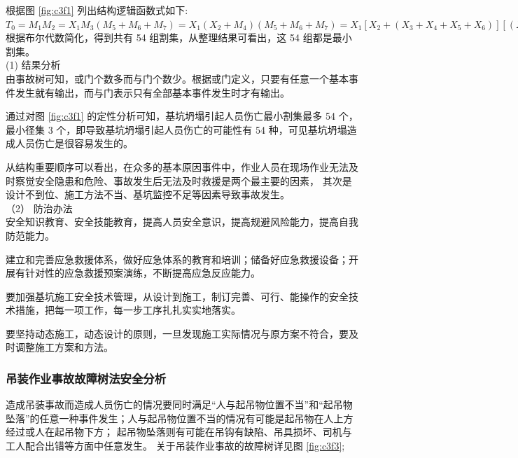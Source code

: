 根据图 \ref{fig:c3f1} 列出结构逻辑函数式如下:\\

$T_0=M_1M_2=X_1M_3(M_5+M_6+M_7)=X_1(X_2+M_4)(M_5+M_6+M_7)=X_1[X_2+(X_3+X_4+X_5+X_6)][(X_7+X_8+X_9)+(X_{10}+X_{11}+X_{12}+X_{13}+X_{14})+(X_{15}+X_{16}+X_{17})+X_{18}]$\\

根据布尔代数简化，得到共有 54 组割集，从整理结果可看出，这 54 组都是最小割集。\\

(1) 结果分析\\

 由事故树可知，或门个数多而与门个数少。根据或门定义，只要有任意一个基本事件发生就有输出，而与门表示只有全部基本事件发生时才有输出。

 通过对图 \ref{fig:c3f1} 的定性分析可知，基坑坍塌引起人员伤亡最小割集最多 54 个，最小径集 3 个，即导致基坑坍塌引起人员伤亡的可能性有 54 种，可见基坑坍塌造成人员伤亡是很容易发生的。

 从结构重要顺序可以看出，在众多的基本原因事件中，作业人员在现场作业无法及时察觉安全隐患和危险、事故发生后无法及时救援是两个最主要的因素，
其次是设计不到位、施工方法不当、基坑监控不足等因素导致事故发生。\\

（2） 防治办法\\

 安全知识教育、安全技能教育，提高人员安全意识，提高规避风险能力，提高自我防范能力。

 建立和完善应急救援体系，做好应急体系的教育和培训；储备好应急救援设备；开展有针对性的应急救援预案演练，不断提高应急反应能力。

 要加强基坑施工安全技术管理，从设计到施工，制订完善、可行、能操作的安全技术措施，把每一项工作，每一步工序扎扎实实地落实。

 要坚持动态施工，动态设计的原则，一旦发现施工实际情况与原方案不符合，要及时调整施工方案和方法。


\subsubsection{吊装作业事故故障树法安全分析}

造成吊装事故而造成人员伤亡的情况要同时满足“人与起吊物位置不当”和“起吊物坠落”的任意一种事件发生；人与起吊物位置不当的情况有可能是起吊物在人上方经过或人在起吊物下方；
起吊物坠落则有可能在吊钩有缺陷、吊具损坏、司机与工人配合出错等方面中任意发生。
关于吊装作业事故的故障树详见图 \ref{fig:c3f3};


